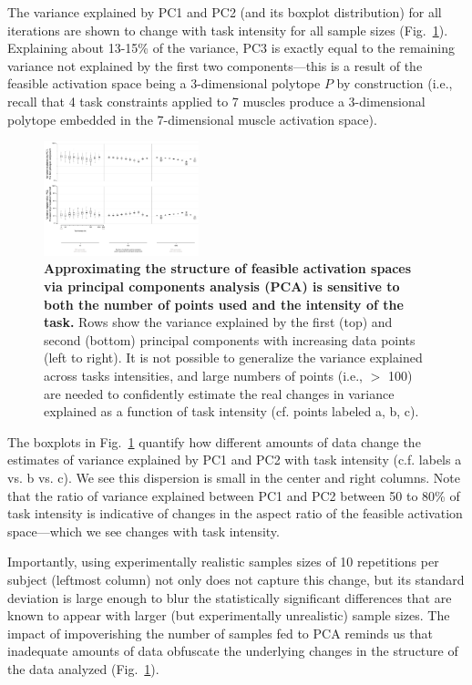 \documentclass[9pt,twocolumn,twoside,lineno]{pnas-new}
\begin{document}
The variance explained by PC1 and PC2 (and its boxplot distribution) for all iterations are shown to change with task intensity for all sample sizes (Fig.~\ref{fig:pca_variance_explained}). Explaining about 13-15\% of the variance, PC3 is exactly equal to the remaining variance not explained by the first two components---this is a result of the feasible activation space being a 3-dimensional polytope $P$ by construction (i.e., recall that 4 task constraints applied to 7 muscles produce a 3-dimensional polytope embedded in the 7-dimensional muscle activation space).

\begin{figure}[htbp]
\centering
\includegraphics[width=0.4\textwidth]{numbered_figures/figure_7_pca_variance_explained.pdf}
\caption{\textbf{Approximating the structure of feasible activation spaces via principal components analysis (PCA) is sensitive to both the number of points used and the intensity of the task.} Rows show the variance explained by the first (top) and second (bottom) principal components with increasing data points (left to right). It is not possible to generalize the variance explained across tasks intensities, and large numbers of points (i.e., $>$ 100) are needed to confidently estimate the real changes in variance explained as a function of task intensity (cf. points labeled a, b, c).}
\label{fig:pca_variance_explained}

\end{figure}

The boxplots in Fig.~\ref{fig:pca_variance_explained} quantify how different amounts of data change the estimates of variance explained by PC1 and PC2 with task intensity (c.f. labels a vs. b vs. c). We see this dispersion is small in the center and right columns.
Note that the ratio of variance explained between PC1 and PC2 between 50 to 80\% of task intensity is indicative of changes in the aspect ratio of the feasible activation space---which we see changes with task intensity.

Importantly, using experimentally realistic samples sizes of 10 repetitions per subject (leftmost column) not only does not capture this change, but its standard deviation is large enough to blur the statistically significant differences that are known to appear with larger (but experimentally unrealistic) sample sizes.
The impact of impoverishing the number of samples fed to PCA reminds us that inadequate amounts of data obfuscate the underlying changes in the structure of the data analyzed (Fig.~\ref{fig:pca_variance_explained}).
\end{document}
